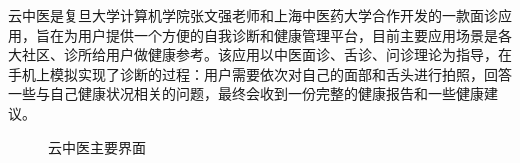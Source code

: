 云中医是复旦大学计算机学院张文强老师和上海中医药大学合作开发的一款面诊应用，旨在为用户提供一个方便的自我诊断和健康管理平台，目前主要应用场景是各大社区、诊所给用户做健康参考。该应用以中医面诊、舌诊、问诊理论为指导，在手机上模拟实现了诊断的过程：用户需要依次对自己的面部和舌头进行拍照，回答一些与自己健康状况相关的问题，最终会收到一份完整的健康报告和一些健康建议。

\begin{figure}[h]
    \centering
    \caption{云中医主要界面}
    \label{fig:main}
\end{figure}

